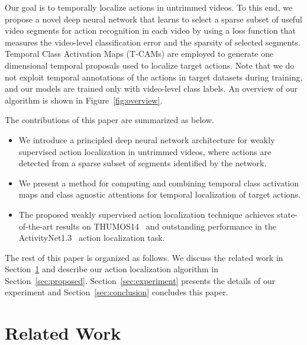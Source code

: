 \documentclass[10pt,twocolumn,letterpaper]{article}
\begin{document}
Our goal is to temporally localize actions in untrimmed videos.
To this end, we propose a novel deep neural network that learns to select a sparse subset of useful video segments for action recognition in each video by using a loss function that measures the video-level classification error and the sparsity of selected segments.
Temporal Class Activation Maps (T-CAMs) are employed to generate one dimensional temporal proposals used to localize target actions.
Note that we do not exploit temporal annotations of the actions in target datasets during training, and our models are trained only with video-level class labels. An overview of our algorithm is shown in Figure~\ref{fig:overview}.

The contributions of this paper are summarized as below.
\begin{itemize}
\item We introduce a principled deep neural network architecture for weakly supervised action localization in untrimmed videos, where actions are detected from a sparse subset of segments identified by the network.
\item We present a method for computing and combining temporal class activation maps and class agnostic attentions for temporal localization of target actions.
\item The proposed weakly supervised action localization technique achieves state-of-the-art results on THUMOS14~\cite{jiang14thumos} and outstanding performance in the ActivityNet1.3~\cite{heilbron15activitynet} action localization task.
\end{itemize}

The rest of this paper is organized as follows.
We discuss the related work in Section~\ref{sec:related} and describe our action localization algorithm in Section~\ref{sec:proposed}.
Section~\ref{sec:experiment} presents the details of our experiment and Section~\ref{sec:conclusion} concludes this paper.
 
\section{Related Work}
\label{sec:related}
\end{document}
